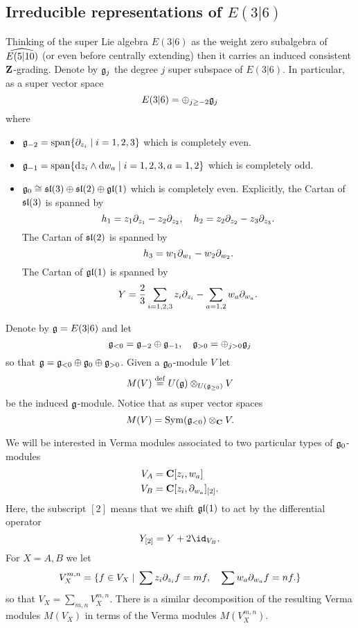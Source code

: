 \documentclass[11pt]{amsart}
\begin{document}
\subsection{Irreducible representations of $E(3|6)$}
Thinking of the super Lie algebra $E(3|6)$ as the weight zero subalgebra of $\Hat{E(5|10)}$ (or even before centrally extending) then it carries an induced consistent $\Z$-grading. 
Denote by $\fg_j$ the degree $j$ super subspace of $E(3|6)$.
In particular, as a super vector space
\[
E(3|6) = \oplus_{j \geq -2} \fg_j
\]
where
\begin{itemize}
\item $\fg_{-2} = {\rm span}\{\del_{z_i}\; | \; {i=1,2,3}\}$ which is completely even. 
\item $\fg_{-1} = {\rm span}\{\d z_i \wedge \d w_a \; | \; i=1,2,3, a=1,2\}$ which is completely odd. 
\item $\fg_0 \cong \lie{sl}(3) \oplus \lie{sl}(2) \oplus \lie{gl}(1)$ which is completely even. 
Explicitly, the Cartan of $\lie{sl}(3)$ is spanned by 
\[
h_1 = z_1 \del_{z_1} - z_2 \del_{z_2}, \quad h_2 = z_2 \del_{z_2} - z_3 \del_{z_3} .
\]
The Cartan of $\lie{sl}(2)$ is spanned by
\[
h_3 = w_1 \del_{w_1} - w_2 \del_{w_2} .
\]
The Cartan of $\lie{gl}(1)$ is spanned by
\[
Y = \frac23 \sum_{i=1,2,3} z_i \del_{z_i} - \sum_{a=1,2} w_a \del_{w_a} .
\]
\end{itemize}

\parsec[s:vermas]

Denote by $\fg = E(3|6)$ and let 
\[
\fg_{<0} = \fg_{-2} \oplus \fg_{-1} , \quad \lie{g}_{>0} = \oplus_{j>0} \fg_j 
\]
so that $\fg = \fg_{<0} \oplus \fg_0 \oplus \fg_{>0}$. 
Given a $\fg_0$-module $V$ let 
\[
M (V) \define U(\fg) \otimes_{U(\fg_{\geq 0})} V 
\]
be the induced $\fg$-module. 
Notice that as super vector spaces 
\[
M(V) = \Sym(\fg_{<0}) \otimes_\C V .
\]

We will be interested in Verma modules associated to two particular types of $\fg_0$-modules
\begin{align*}
V_A & = \C[z_i, w_a] \\
V_B & = \C[z_i, \del_{w_a}]_{[2]} .
\end{align*}
Here, the subscript $[2]$ means that we shift $\lie{gl}(1)$ to act by the differential operator 
\[
Y_{[2]} = Y + 2 \id_{V_B} .
\]
For $X = A,B$ we let 
\[
V_X^{m,n} = \{f \in V_X \; | \; \sum z_i \del_{z_i} f = m f , \quad \sum w_a \del_{w_a} f = n f.\} 
\]
so that $V_X = \sum_{m,n} V_X^{m,n}$. 
There is a similar decomposition of the resulting Verma modules $M(V_X)$ in terms of the Verma modules $M(V_{X}^{m,n})$. 
\end{document}
